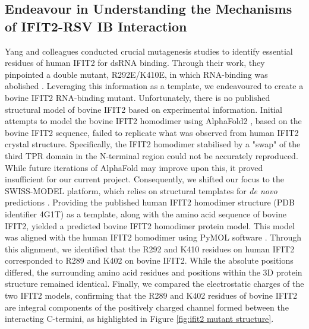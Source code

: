 \subsection{Endeavour in Understanding the Mechanisms of IFIT2-RSV IB Interaction} \label{subsec:Endeavour in Understanding the Mechanisms of IFIT2-RSV IB Interaction}
Yang and colleagues conducted crucial mutagenesis studies to identify essential residues of human IFIT2 for dsRNA binding. Through their work, they pinpointed a double mutant, R292E/K410E, in which RNA-binding was abolished \cite{Yang2012CrystalMechanisms}. Leveraging this information as a template, we endeavoured to create a bovine IFIT2 RNA-binding mutant. Unfortunately, there is no published structural model of bovine IFIT2 based on experimental information. Initial attempts to model the bovine IFIT2 homodimer using AlphaFold2 \cite{Jumper2021HighlyAlphaFold}, based on the bovine IFIT2 sequence, failed to replicate what was observed from human IFIT2 crystal structure. Specifically, the IFIT2 homodimer stabilised by a "swap" of the third TPR domain in the N-terminal region could not be accurately reproduced. While future iterations of AlphaFold may improve upon this, it proved insufficient for our current project. Consequently, we shifted our focus to the SWISS-MODEL platform, which relies on structural templates for \textit{de novo} predictions \cite{Waterhouse2018SWISS-MODEL:Complexes}. Providing the published human IFIT2 homodimer structure (PDB identifier 4G1T) as a template, along with the amino acid sequence of bovine IFIT2, yielded a predicted bovine IFIT2 homodimer protein model. This model was aligned with the human IFIT2 homodimer using PyMOL software \cite{SchrodingerTeam2023TheSystem}. Through this alignment, we identified that the R292 and K410 residues on human IFIT2 corresponded to R289 and K402 on bovine IFIT2. While the absolute positions differed, the surrounding amino acid residues and positions within the 3D protein structure remained identical. Finally, we compared the electrostatic charges of the two IFIT2 models, confirming that the R289 and K402 residues of bovine IFIT2 are integral components of the positively charged channel formed between the interacting C-termini, as highlighted in Figure \ref{fig:ifit2 mutant structure}.

